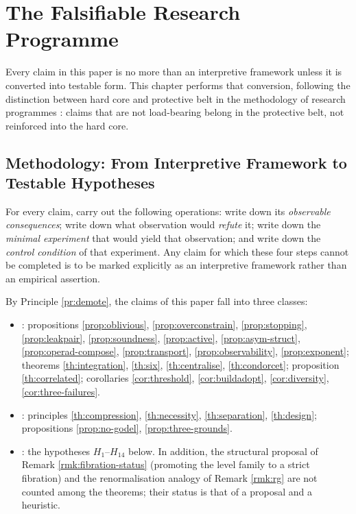 \chapter{The Falsifiable Research Programme}\label{ch:program}

Every claim in this paper is no more than an interpretive framework unless it is converted
into testable form. This chapter performs that conversion, following the distinction
between hard core and protective belt in the methodology of research programmes
\cite{lakatos1970}: claims that are not load-bearing belong in the protective belt, not
reinforced into the hard core.

\section{Methodology: From Interpretive Framework to Testable Hypotheses}

\begin{principle}\label{pr:demote}
For every claim, carry out the following operations: write down its \emph{observable
consequences}; write down what observation would \emph{refute} it; write down the
\emph{minimal experiment} that would yield that observation; and write down the
\emph{control condition} of that experiment. Any claim for which these four steps cannot be
completed is to be marked explicitly as an interpretive framework rather than an empirical
assertion.
\end{principle}

By Principle \ref{pr:demote}, the claims of this paper fall into three classes:

\begin{itemize}
\item {}: propositions \ref{prop:oblivious}, \ref{prop:overconstrain},
      \ref{prop:stopping}, \ref{prop:leakpair}, \ref{prop:soundness},
      \ref{prop:active}, \ref{prop:asym-struct}, \ref{prop:operad-compose},
      \ref{prop:transport}, \ref{prop:observability}, \ref{prop:exponent}; theorems
      \ref{th:integration}, \ref{th:six}, \ref{th:centralise},
      \ref{th:condorcet}; proposition \ref{th:correlated}; corollaries
      \ref{cor:threshold}, \ref{cor:buildadopt}, \ref{cor:diversity},
      \ref{cor:three-failures}.
\item {}: principles \ref{th:compression},
      \ref{th:necessity}, \ref{th:separation}, \ref{th:design}; propositions
      \ref{prop:no-godel}, \ref{prop:three-grounds}.
\item {}: the hypotheses $H_1$--$H_{14}$ below. In
      addition, the structural proposal of Remark \ref{rmk:fibration-status} (promoting the
      level family to a strict fibration) and the renormalisation analogy of Remark
      \ref{rmk:rg} are not counted among the theorems; their status is that of a proposal
      and a heuristic.
\end{itemize}

